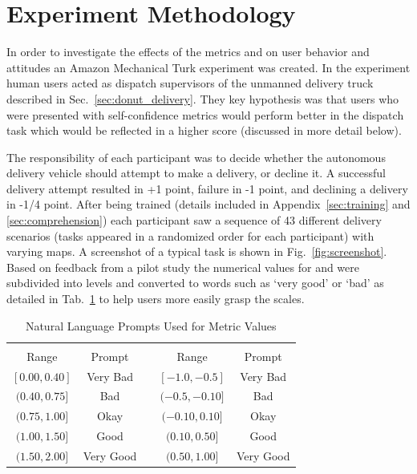 \section{Experiment Methodology} \label{sec:methodology}
    In order to investigate the effects of the metrics \xQ{} and \xO{} on user behavior and attitudes an Amazon Mechanical Turk experiment was created. In the experiment human users acted as dispatch supervisors of the unmanned delivery truck described in Sec.~\ref{sec:donut_delivery}. They key hypothesis was that users who were presented with self-confidence metrics would perform better in the dispatch task which would be reflected in a higher score (discussed in more detail below).

    The responsibility of each participant was to decide whether the autonomous delivery vehicle should attempt to make a delivery, or decline it. A successful delivery attempt resulted in +1 point, failure in -1 point, and declining a delivery in -1/4 point. After being trained (details included in Appendix~\ref{sec:training} and \ref{sec:comprehension}) each participant saw a sequence of 43 different delivery scenarios (tasks appeared in a randomized order for each participant) with varying maps. A screenshot of a typical task is shown in Fig.~\ref{fig:screenshot}. Based on feedback from a pilot study the numerical values for \xQ{} and \xP{} were subdivided into levels and converted to words such as `very good' or `bad' as detailed in Tab.~\ref{tab:word_ranges} to help users more easily grasp the scales.

    \begin{table}[]
        \caption{Natural Language Prompts Used for Metric Values}
        \label{tab:word_ranges}
        \begin{tabular}{cclcc}
            \multicolumn{2}{c}{\xQ{}} & \vline & \multicolumn{2}{c}{\xO{}} \\
            Range & Prompt & \vline & Range & Prompt \\
            \hline
            $[0.00,0.40]$ & Very Bad & \vline & $[-1.0,-0.5]$ & Very Bad \\
            $(0.40,0.75]$ & Bad & \vline & $(-0.5,-0.10]$ & Bad \\
            $(0.75,1.00]$ & Okay & \vline & $(-0.10,0.10]$ & Okay \\
            $(1.00,1.50]$ & Good & \vline & $(0.10,0.50]$ & Good \\
            $(1.50,2.00]$ & Very Good & \vline & $(0.50,1.00]$ & Very Good
        \end{tabular}
    \end{table}

